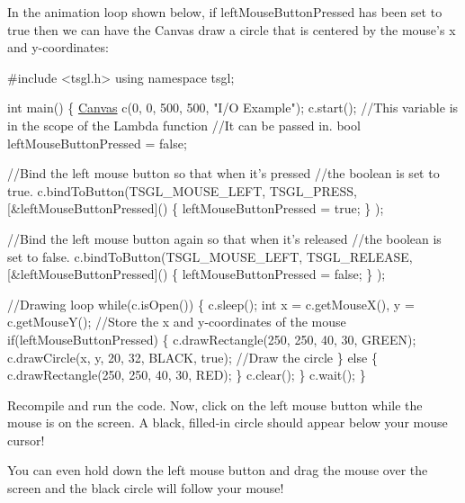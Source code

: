In the animation loop shown below, if {\ttfamily left\-Mouse\-Button\-Pressed} has been set to {\ttfamily true} then we can have the Canvas draw a circle that is centered by the mouse's x and y-\/coordinates\-:


\begin{DoxyCode}
\textcolor{preprocessor}{#include <tsgl.h>}
\textcolor{keyword}{using namespace }tsgl;

\textcolor{keywordtype}{int} main() \{
  \hyperlink{classtsgl_1_1_canvas}{Canvas} c(0, 0, 500, 500, \textcolor{stringliteral}{"I/O Example"});
  c.start();
  \textcolor{comment}{//This variable is in the scope of the Lambda function }
  \textcolor{comment}{//It can be passed in.}
  \textcolor{keywordtype}{bool} leftMouseButtonPressed = \textcolor{keyword}{false};

  \textcolor{comment}{//Bind the left mouse button so that when it's pressed}
  \textcolor{comment}{//the boolean is set to true.}
  c.bindToButton(TSGL\_MOUSE\_LEFT, TSGL\_PRESS, 
                    [&leftMouseButtonPressed]() \{
                          leftMouseButtonPressed = \textcolor{keyword}{true};
                    \}
                );

  \textcolor{comment}{//Bind the left mouse button again so that when it's released }
  \textcolor{comment}{//the boolean is set to false.}
  c.bindToButton(TSGL\_MOUSE\_LEFT, TSGL\_RELEASE, 
                    [&leftMouseButtonPressed]() \{
                          leftMouseButtonPressed = \textcolor{keyword}{false};
                    \}
                );

  \textcolor{comment}{//Drawing loop}
  \textcolor{keywordflow}{while}(c.isOpen()) \{
    c.sleep();
    \textcolor{keywordtype}{int} x = c.getMouseX(), y = c.getMouseY();  \textcolor{comment}{//Store the x and y-coordinates of the mouse}
    \textcolor{keywordflow}{if}(leftMouseButtonPressed) \{
      c.drawRectangle(250, 250, 40, 30, GREEN);
      c.drawCircle(x, y, 20, 32, BLACK, \textcolor{keyword}{true});  \textcolor{comment}{//Draw the circle}
    \} \textcolor{keywordflow}{else} \{
      c.drawRectangle(250, 250, 40, 30, RED);
    \}
    c.clear();
  \}
  c.wait();
\}
\end{DoxyCode}


Recompile and run the code. Now, click on the left mouse button while the mouse is on the screen. A black, filled-\/in circle should appear below your mouse cursor!

You can even hold down the left mouse button and drag the mouse over the screen and the black circle will follow your mouse!

